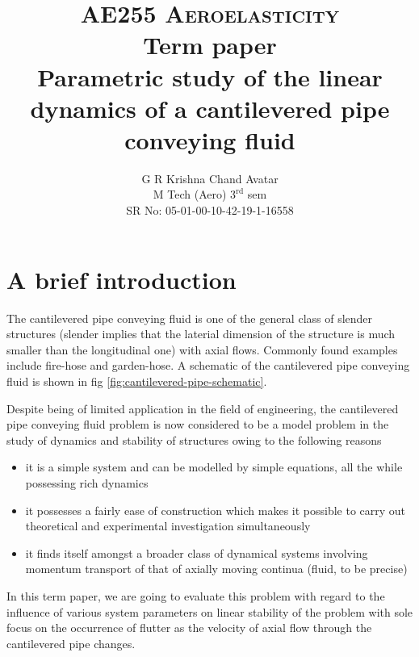 \documentclass[12pt]{report}
\begin{document}
	\title{{\large \textsc{AE255 Aeroelasticity} \\ Term paper} \\ \vspace{25mm}  \bfseries Parametric study of the linear dynamics of a cantilevered pipe conveying fluid \\ \vspace{35mm}}
	\author{G R Krishna Chand Avatar\\ M Tech (Aero) $3^{\text{rd}}$ sem \\ SR No: 05-01-00-10-42-19-1-16558}
	\maketitle
	\tableofcontents

\chapter{A brief introduction}
The cantilevered pipe conveying fluid is one of the general class of slender structures (slender implies that the laterial dimension of the structure is much smaller than the longitudinal one) with axial flows. Commonly found examples include fire-hose and garden-hose. A schematic of the cantilevered pipe conveying fluid is shown in fig \ref{fig:cantilevered-pipe-schematic}.

Despite being of limited application in the field of engineering, the cantilevered pipe conveying fluid problem is now considered to be a model problem in the study of dynamics and stability of structures owing to the following reasons \cite{paidoussis1993}
\begin{itemize}
	\item it is a simple system  and can be modelled by simple equations, all the while possessing rich dynamics
	
	\item it possesses a fairly ease of construction which makes it possible to carry out theoretical and experimental investigation simultaneously
	
	\item it finds itself amongst a broader class of dynamical systems involving momentum transport of that of axially moving continua (fluid, to be precise) 
\end{itemize}

In this term paper, we are going to evaluate this problem with regard to the influence of various system parameters on linear stability of the problem with sole focus on the occurrence of flutter as the velocity of axial flow through the cantilevered pipe changes. 
\end{document}
